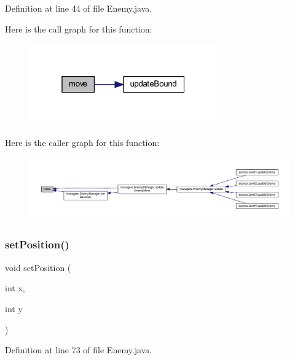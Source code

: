 Definition at line 44 of file Enemy.\+java.

Here is the call graph for this function\+:\nopagebreak
\begin{figure}[H]
\begin{center}
\leavevmode
\includegraphics[width=229pt]{classenemies_1_1_enemy_a474fd9bb876d55f65850132777c539d8_cgraph}
\end{center}
\end{figure}
Here is the caller graph for this function\+:\nopagebreak
\begin{figure}[H]
\begin{center}
\leavevmode
\includegraphics[width=350pt]{classenemies_1_1_enemy_a474fd9bb876d55f65850132777c539d8_icgraph}
\end{center}
\end{figure}
\mbox{\label{classenemies_1_1_enemy_ad6c107fadf835c74a229f8cac0cc98ab}} 
\subsubsection{\texorpdfstring{set\+Position()}{setPosition()}}
{\footnotesize\ttfamily void set\+Position (\begin{DoxyParamCaption}\item[{int}]{x,  }\item[{int}]{y }\end{DoxyParamCaption})}



Definition at line 73 of file Enemy.\+java.

